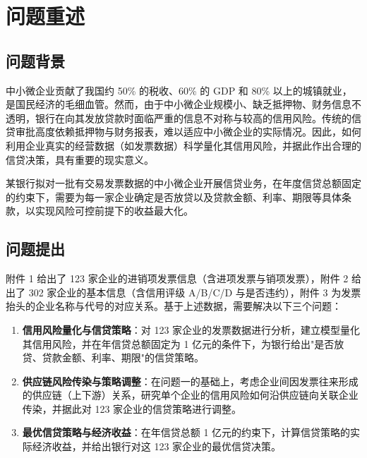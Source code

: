 \documentclass[12pt]{ctexart}
\begin{document}
\clearpage

\tableofcontents
\clearpage

\section{问题重述}

\subsection{问题背景}

中小微企业贡献了我国约 50\% 的税收、60\% 的 GDP 和 80\% 以上的城镇就业，是国民经济的毛细血管。然而，由于中小微企业规模小、缺乏抵押物、财务信息不透明，银行在向其发放贷款时面临严重的信息不对称与较高的信用风险。传统的信贷审批高度依赖抵押物与财务报表，难以适应中小微企业的实际情况。因此，如何利用企业真实的经营数据（如发票数据）科学量化其信用风险，并据此作出合理的信贷决策，具有重要的现实意义。

某银行拟对一批有交易发票数据的中小微企业开展信贷业务，在年度信贷总额固定的约束下，需要为每一家企业确定是否放贷以及贷款金额、利率、期限等具体条款，以实现风险可控前提下的收益最大化。

\subsection{问题提出}

附件 1 给出了 123 家企业的进销项发票信息（含进项发票与销项发票），附件 2 给出了 302 家企业的基本信息（含信用评级 A/B/C/D 与是否违约），附件 3 为发票抬头的企业名称与代号的对应关系。基于上述数据，需要解决以下三个问题：

\begin{enumerate}[label=(\arabic*),itemsep=2pt]
    \item \textbf{信用风险量化与信贷策略}：对 123 家企业的发票数据进行分析，建立模型量化其信用风险，并在年信贷总额固定为 1 亿元的条件下，为银行给出"是否放贷、贷款金额、利率、期限"的信贷策略。
    \item \textbf{供应链风险传染与策略调整}：在问题一的基础上，考虑企业间因发票往来形成的供应链（上下游）关系，研究单个企业的信用风险如何沿供应链向关联企业传染，并据此对 123 家企业的信贷策略进行调整。
    \item \textbf{最优信贷策略与经济收益}：在年信贷总额 1 亿元的约束下，计算信贷策略的实际经济收益，并给出银行对这 123 家企业的最优信贷决策。
\end{enumerate}
\end{document}
